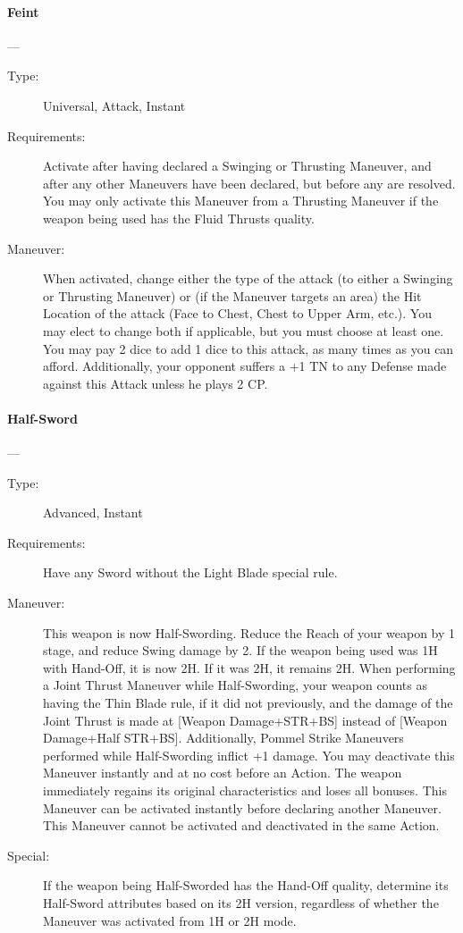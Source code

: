 \documentclass[oneside,11pt,english]{book}
\begin{document}
\paragraph{\large\label{man:Feint}Feint}---\quad{\large[2+Variable]}
\vspace{-10pt}\begin{description} 
\item [Type:] Universal, Attack, Instant 
\item [Requirements:] Activate after having declared a Swinging or Thrusting Maneuver, and after any other Maneuvers have been declared, but before any are resolved. You may only activate this Maneuver from a Thrusting Maneuver if the weapon being used has the Fluid Thrusts quality. 
\item [Maneuver:] When activated, change either the type of the attack (to either a Swinging or Thrusting Maneuver) or (if the Maneuver targets an area) the Hit Location of the attack (Face to Chest, Chest to Upper Arm, etc.). You may elect to change both if applicable, but you must choose at least one. You may pay 2 dice to add 1 dice to this attack, as many times as you can afford. Additionally, your opponent suffers a +1 TN to any Defense made against this Attack unless he plays 2 CP.
\end{description}

\paragraph{\large\label{man:Half-Sword}Half-Sword}---\quad{\large[1]}
\vspace{-10pt}\begin{description} 
\item [Type:] Advanced, Instant 
\item [Requirements:] Have any Sword without the Light Blade special rule. 
\item [Maneuver:] This weapon is now Half-Swording. Reduce the Reach of your weapon by 1 stage, and reduce Swing damage by 2. If the weapon being used was 1H with Hand-Off, it is now 2H. If it was 2H, it remains 2H. When performing a Joint Thrust Maneuver while Half-Swording, your weapon counts as having the Thin Blade rule, if it did not previously, and the damage of the Joint Thrust is made at [Weapon Damage+STR+BS] instead of [Weapon Damage+Half STR+BS]. Additionally, Pommel Strike Maneuvers performed while Half-Swording inflict +1 damage. You may deactivate this Maneuver instantly and at no cost before an Action. The weapon immediately regains its original characteristics and loses all bonuses. This Maneuver can be activated instantly before declaring another Maneuver. This Maneuver cannot be activated and deactivated in the same Action.
\item [Special:] If the weapon being Half-Sworded has the Hand-Off quality, determine its Half-Sword attributes 
based on its 2H version, regardless of whether the Maneuver was activated from 1H or 2H mode. 
\end{description}
\end{document}
